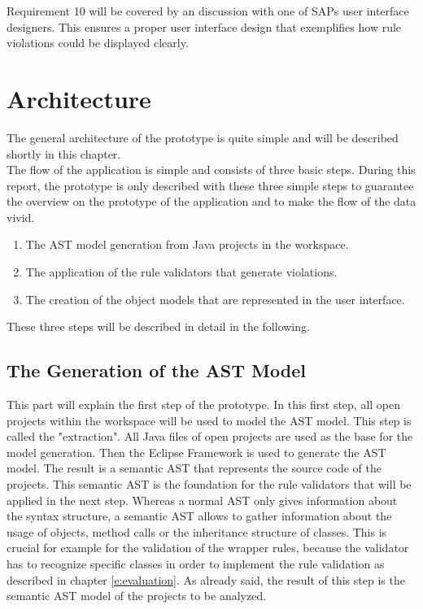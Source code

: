 Requirement 10 will be covered by an discussion with one of SAPs user interface designers. This ensures a proper user interface design that exemplifies how rule violations could be displayed clearly.
\\

\section{Architecture}
\label{p:architecture}
The general architecture of the prototype is quite simple and will be described shortly in this chapter. 
\\

The flow of the application is simple and consists of three basic steps. During this report, the prototype is only described with these three simple steps to guarantee the overview on the prototype of the application and to make the flow of the data vivid.

\begin{enumerate}
  \item The \ac{AST} model generation from Java projects in the workspace.
  \item The application of the rule validators that generate violations.
  \item The creation of the object models that are represented in the user interface. 
\end{enumerate}

These three steps will be described in detail in the following. 

\subsection{The Generation of the AST Model}
This part will explain the first step of the prototype. In this first step, all open projects within the workspace will be used to model the \ac{AST} model. This step is called the "extraction". All Java files of open projects are used as the base for the model generation. Then the Eclipse Framework is used to generate the  \ac{AST} model. The result is a semantic \ac{AST} that represents the source code of the projects. This semantic \ac{AST}  is the foundation for the rule validators that will be applied in the next step. Whereas a normal \ac{AST} only gives information about the syntax structure, a semantic \ac{AST} allows to gather information about the usage of objects, method calls or the inheritance structure of classes. This is crucial for example for the validation of the wrapper rules, because the validator has to recognize specific classes in order to implement the rule validation as described in chapter \ref{e:evaluation}. As already said, the result of this step is the semantic \ac{AST} model of the projects to be analyzed. 


